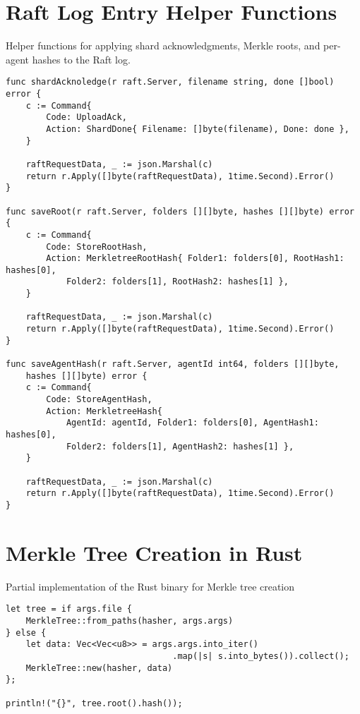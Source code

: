 \section{Raft Log Entry Helper Functions} \label{code:raft-method-to-add-log}

\begin{listing}[H]
\caption{Helper functions for applying shard acknowledgments, Merkle roots, and per-agent hashes to the Raft log.}
\begin{verbatim}
func shardAcknoledge(r raft.Server, filename string, done []bool) error {
    c := Command{
        Code: UploadAck,
        Action: ShardDone{ Filename: []byte(filename), Done: done },
    }

    raftRequestData, _ := json.Marshal(c)
    return r.Apply([]byte(raftRequestData), 1time.Second).Error()
}

func saveRoot(r raft.Server, folders [][]byte, hashes [][]byte) error {
    c := Command{
        Code: StoreRootHash,
        Action: MerkletreeRootHash{ Folder1: folders[0], RootHash1: hashes[0],
            Folder2: folders[1], RootHash2: hashes[1] },
    }

    raftRequestData, _ := json.Marshal(c)
    return r.Apply([]byte(raftRequestData), 1time.Second).Error()
}

func saveAgentHash(r raft.Server, agentId int64, folders [][]byte,
    hashes [][]byte) error {
    c := Command{
        Code: StoreAgentHash,
        Action: MerkletreeHash{
            AgentId: agentId, Folder1: folders[0], AgentHash1: hashes[0],
            Folder2: folders[1], AgentHash2: hashes[1] },
    }

    raftRequestData, _ := json.Marshal(c)
    return r.Apply([]byte(raftRequestData), 1time.Second).Error()
}
\end{verbatim}
\end{listing}



\section{Merkle Tree Creation in Rust} \label{code:partial-mt-rs-1}

\begin{listing}[H]
\caption{Partial implementation of the Rust binary for Merkle tree creation}
\begin{verbatim}
let tree = if args.file {
    MerkleTree::from_paths(hasher, args.args)
} else {
    let data: Vec<Vec<u8>> = args.args.into_iter()
                                 .map(|s| s.into_bytes()).collect();
    MerkleTree::new(hasher, data)
};

println!("{}", tree.root().hash());
\end{verbatim}
\end{listing}

